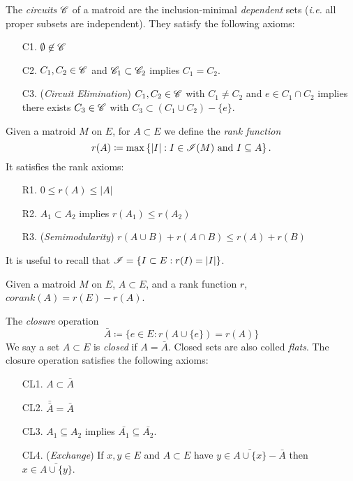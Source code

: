 \begin{definition}[Circuits]
    The \textit{circuits} $\mathscr{C}$ of a matroid are the inclusion-minimal \textit{dependent} sets (\textit{i.e.} all proper subsets are independent).
    They satisfy the following axioms:
    \begin{enumerate}
        \item[C1.] $\emptyset \not\in \mathscr{C}$
        \item[C2.] $C_1, C_2 \in \mathscr{C}$ and $\mathscr{C}_1 \subset \mathscr{C}_2$ implies $C_1 = C_2$.
        \item[C3.] (\textit{Circuit Elimination}) $C_1, C_2 \in \mathscr{C}$ with $C_1 \neq C_2$ and $e \in C_1 \cap C_2$ implies there exists $C_3 \in \mathscr{C}$ with $C_3 \subset (C_1 \cup C_2) - \{ e \}$.
    \end{enumerate}
\end{definition}

\begin{definition}
    Given a matroid $M$ on $E$, for $A \subset E$ we define the \textit{rank function}
    $$ r(A) \coloneqq \max \left\lbrace |I|: I \in \mathscr{I}(M) \text{ and } I \subseteq A \right\rbrace.$$
    It satisfies the rank axioms:
    \begin{enumerate}
        \item[R1.] $0 \leq r(A) \leq |A|$
        \item[R2.] $A_1 \subset A_2$ implies $r(A_1) \leq r(A_2)$
        \item[R3.] (\textit{Semimodularity}) $r(A \cup B) + r(A \cap B) \leq r(A) + r(B)$
    \end{enumerate}
    It is useful to recall that $\mathscr{I} = \{ I \subset E : r(I) = |I| \}$.
\end{definition}

\begin{definition}[Corank]
    Given a matroid $M$ on $E$, $A \subset E$, and a rank function $r$, $corank(A) = r(E) - r(A)$.
\end{definition}

\begin{definition}
    The \textit{closure} operation
    $$\bar{A} \coloneqq \{ e \in E : r(A \cup \{ e \}) = r(A) \}$$
    We say a set $A \subset E$ is \textit{closed} if $A = \bar{A}$.
    Closed sets are also colled \textit{flats}.
    The closure operation satisfies the following axioms:
    \begin{enumerate}
        \item[CL1.] $A \subset \bar{A}$
        \item[CL2.] $\bar{\bar{A}} = \bar{A}$
        \item[CL3.] $A_1 \subseteq A_2$ implies $\bar{A_1} \subseteq \bar{A_2}$.
        \item[CL4.] (\textit{Exchange}) If $x,y \in E$ and $A \subset E$ have $y \in \bar{A \cup \{x \}} - \bar{A}$ then $x \in \bar{A \cup \{ y \}}$.
    \end{enumerate}
\end{definition}

